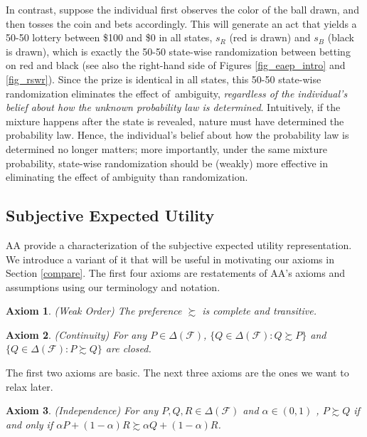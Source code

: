 \documentclass[12pt, notitlepage]{article}
\newtheorem{axiom}{Axiom}
\begin{document}
In contrast, suppose the individual first observes the color of the ball
drawn, and then tosses the coin and bets accordingly. This will generate an
act that yields a 50-50 lottery between \$100 and \$0 in all states, $s_{R}$
(red is drawn) and $s_{B}$ (black is drawn), which is exactly the 50-50
state-wise randomization between betting on red and black (see also the
right-hand side of Figures \ref{fig_eaep_intro} and \ref{fig_rswr}). Since
the prize is identical in all states, this 50-50 state-wise randomization
eliminates the effect of\ ambiguity, \textit{regardless of the individual's
belief about how the unknown probability law is determined}. Intuitively, if
the mixture happens after the state is revealed, nature must have determined
the probability law. Hence, the individual's belief about how the
probability law is determined no longer matters; more importantly, under the
same mixture probability, state-wise randomization should be (weakly) more
effective in eliminating the effect of ambiguity than randomization.

\subsection{Subjective Expected Utility}

AA provide a characterization of the subjective expected utility
representation. We introduce a variant of it that will be useful in
motivating our axioms in Section \ref{compare}. The first four axioms are
restatements of AA's axioms and assumptions using our terminology and
notation.

\begin{axiom}
(Weak Order) The preference $\succsim $ is complete and transitive.
\end{axiom}

\begin{axiom}
(Continuity) For any $P\in \Delta (\mathcal{F})$, $\{Q\in \Delta (\mathcal{F}%
):Q\succsim P\}$ and $\{Q\in \Delta (\mathcal{F}):P\succsim Q\}$ are closed.
\end{axiom}

The first two axioms are basic. The next three axioms are the ones we want
to relax later.

\begin{axiom}
(Independence) For any $P,Q,R\in \Delta (\mathcal{F})$ and $\alpha \in (0,1)$%
, $P\succsim Q$ if and only if $\alpha P+(1-\alpha )R\succsim \alpha
Q+(1-\alpha )R$.
\end{axiom}
\end{document}
